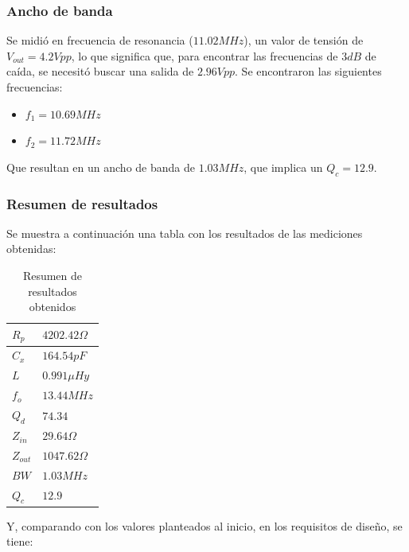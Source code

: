 \documentclass{article}
\begin{document}
\subsubsection{Ancho de banda}
Se midió en frecuencia de resonancia ($11.02 MHz$), un valor de tensión de $V_{out}=4.2 Vpp$, lo que significa que, para encontrar las frecuencias de $3 dB$ de caída, se necesitó buscar una salida de $2.96 Vpp$. Se encontraron las siguientes frecuencias:
\begin{itemize}
    \item $f_1=10.69 MHz$
    \item $	f_2=11.72 MHz$
\end{itemize}
\noindent Que resultan en un ancho de banda de $1.03 MHz$, que implica un $Q_c=12.9$.
\subsubsection{Resumen de resultados}
Se muestra a continuación una tabla con los resultados de las mediciones obtenidas:
\begin{table}[h]
    \centering
    \label{tabla-1}
    \begin{tabular}{|l|l|}
    \hline
    $R_p$ & $4202.42 \Omega$ \\ \hline
    $C_x$ & $164.54 pF$ \\ \hline
    $L$ & $0.991 \mu Hy$ \\ \hline
    $f_o$ & $13.44 MHz$ \\ \hline
    $Q_d$ & $74.34$ \\ \hline
    $Z_{in}$ & $29.64 \Omega$ \\ \hline
    $Z_{out}$ & $1047.62 \Omega$ \\ \hline
    $BW$ & $1.03 MHz$ \\ \hline
    $Q_c$ & $12.9$ \\ \hline
    \end{tabular}
    \caption{Resumen de resultados obtenidos}
\end{table}
\newpage
Y, comparando con los valores planteados al inicio, en los requisitos de diseño, se tiene:
\end{document}
